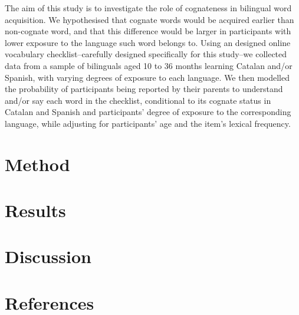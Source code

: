 \documentclass[
  english,
  man,man,floatsintext]{apa6}
\begin{document}
The aim of this study is to investigate the role of cognateness in bilingual word acquisition. We hypothesised that cognate words would be acquired earlier than non-cognate word, and that this difference would be larger in participants with lower exposure to the language such word belongs to. Using an designed online vocabulary checklist--carefully designed specifically for this study--we collected data from a sample of bilinguals aged 10 to 36 months learning Catalan and/or Spanish, with varying degrees of exposure to each language. We then modelled the probability of participants being reported by their parents to understand and/or say each word in the checklist, conditional to its cognate status in Catalan and Spanish and participants' degree of exposure to the corresponding language, while adjusting for participants' age and the item's lexical frequency.

\hypertarget{method}{%
\section{Method}\label{method}}

\hypertarget{results}{%
\section{Results}\label{results}}

\hypertarget{discussion}{%
\section{Discussion}\label{discussion}}

\hypertarget{references}{%
\section{References}\label{references}}

\begingroup
\setlength{\parindent}{-0.5in}
\setlength{\leftskip}{0.5in}
\end{document}

